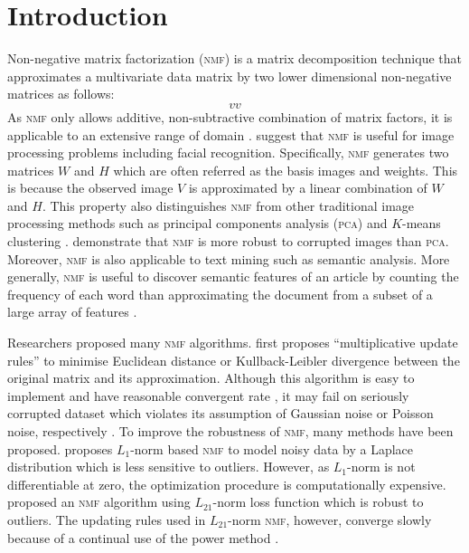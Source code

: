 \section{Introduction\label{chapter1}}
Non-negative matrix factorization (\textsc{nmf}) is a matrix decomposition technique that approximates a multivariate data matrix by two lower dimensional non-negative matrices as follows:
\begin{equation}
  vv
\end{equation}
As \textsc{nmf} only allows additive, non-subtractive combination of matrix factors, it is applicable to an extensive range of domain . \citet{lee1999learning} suggest that \textsc{nmf} is useful for image processing problems including facial recognition. Specifically, \textsc{nmf} generates two matrices $W$ and $H$ which are often referred as the basis images and weights. This is because the observed image $V$ is approximated by a linear combination of $W$ and $H$. This property also distinguishes \textsc{nmf} from other traditional image processing methods such as principal components analysis (\textsc{pca}) and $K$-means clustering . \citet{guillamet2002non} demonstrate that \textsc{nmf} is more robust to corrupted images than \textsc{pca}.
Moreover, \textsc{nmf} is also applicable to text mining such as semantic analysis. More generally, \textsc{nmf} is useful to discover semantic features of an article by counting the frequency of each word than approximating the document from a subset of a large array of features \citep{lee1999learning}.

Researchers proposed many \textsc{nmf} algorithms. \citet{lee2001algorithms} first proposes ``multiplicative update rules'' to minimise Euclidean distance or Kullback-Leibler divergence between the original matrix and its approximation. Although this algorithm is easy to implement and have reasonable convergent rate \citep{lee2001algorithms}, it may fail on seriously corrupted dataset which violates its assumption of Gaussian noise or Poisson noise, respectively \citep{guan2017truncated}.  To improve the robustness of \textsc{nmf}, many methods have been proposed. \citet{lam2008non} proposes ${L_1}$-norm based \textsc{nmf} to model noisy data by a Laplace distribution which is less sensitive to outliers. However, as $L_1$-norm is not differentiable at zero, the optimization procedure is computationally expensive. \citet{kong2011robust} proposed an \textsc{nmf} algorithm using $L_{21}$-norm loss function which is robust to outliers. The updating rules used in $L_{21}$-norm \textsc{nmf}, however, converge slowly because of a continual use of the power method \citep{guan2017truncated}.

